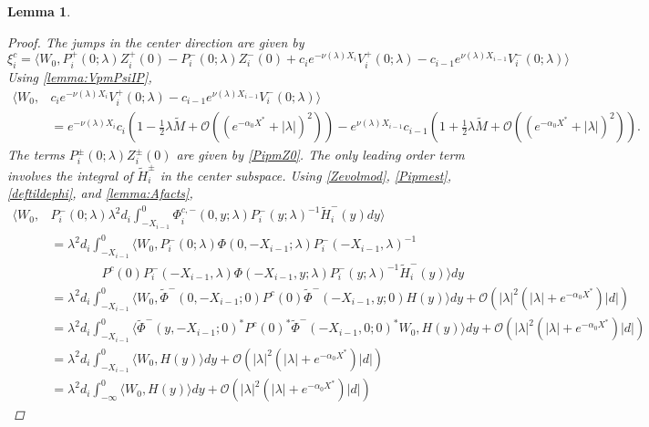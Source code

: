 \documentclass[10pt,reqno]{amsart}
\theoremstyle{plain}
\newtheorem{lemma}[theorem]{Lemma}
\theoremstyle{definition}
\theoremstyle{remark}
\numberwithin{theorem}{section}
\numberwithin{equation}{section}
\begin{document}
\begin{lemma}
\begin{proof}
The jumps in the center direction are given by
\[
\xi_i^c = 
\langle W_0, P_i^+(0; \lambda) Z_i^+(0) - P_i^-(0; \lambda) Z_i^-(0) + c_i e^{-\nu(\lambda)X_i}V_i^+(0; \lambda) - c_{i-1} e^{\nu(\lambda)X_{i-1}} V_i^-(0; \lambda) \rangle 
\]
Using \cref{lemma:VpmPsiIP},
\begin{align*}
\langle W_0, &c_i e^{-\nu(\lambda)X_i}V_i^+(0; \lambda) - c_{i-1} e^{\nu(\lambda)X_{i-1}} V_i^-(0; \lambda) \rangle \\
&= e^{-\nu(\lambda)X_i}c_i\left( 1 - \frac{1}{2}\lambda \tilde{M} + \mathcal{O}\left( (e^{-\alpha_0 X^*} +|\lambda|)^2 \right) \right) 
- e^{\nu(\lambda)X_{i-1}}c_{i-1}\left( 1 + \frac{1}{2}\lambda \tilde{M} + \mathcal{O}\left( (e^{-\alpha_0 X^*} +|\lambda|)^2 \right) \right).
\end{align*}
The terms $P_i^\pm(0; \lambda) Z_i^\pm(0)$ are given by \cref{PipmZ0}. The only leading order term involves the integral of $\tilde{H}_i^\pm$ in the center subspace. Using \cref{Zevolmod}, \cref{Pipmest}, \cref{deftildephi}, and \cref{lemma:Afacts},
\begin{equation*}
\begin{aligned}
\langle W_0, &P_i^-(0; \lambda) \lambda^2 d_i \int_{-X_{i-1}}^0 \Phi_i^{c,-}(0, y; \lambda) P_i^-(y; \lambda)^{-1} \tilde{H}_i^-(y) dy \rangle \\
&= \lambda^2 d_i \int_{-X_{i-1}}^0 \langle W_0, P_i^-(0; \lambda) \Phi(0, -X_{i-1}; \lambda) P_i^-(-X_{i-1}, \lambda)^{-1} \\
&\qquad \qquad
P^c(0) P_i^-(-X_{i-1}, \lambda) \Phi(-X_{i-1}, y; \lambda) P_i^-(y; \lambda)^{-1} \tilde{H}_i^-(y) \rangle dy \\
&= \lambda^2 d_i \int_{-X_{i-1}}^0 \langle W_0, \tilde{\Phi}^-(0, -X_{i-1}; 0) 
P^c(0) \tilde{\Phi}^-(-X_{i-1}, y; 0) H(y) \rangle dy + \mathcal{O}(|\lambda|^2 (|\lambda| + e^{- \alpha_0 X^*}) |d|) \\
&= \lambda^2 d_i \int_{-X_{i-1}}^0 \langle \tilde{\Phi}^-(y, -X_{i-1}; 0)^* P^c(0)^* \tilde{\Phi}^-(-X_{i-1}, 0; 0)^* W_0,
 H(y) \rangle dy + \mathcal{O}(|\lambda|^2 (|\lambda| + e^{- \alpha_0 X^*}) |d|) \\
&= \lambda^2 d_i \int_{-X_{i-1}}^0 \langle W_0, H(y) \rangle dy + \mathcal{O}(|\lambda|^2 (|\lambda| + e^{- \alpha_0 X^*}) |d|) \\
&= \lambda^2 d_i \int_{-\infty}^0 \langle W_0, H(y) \rangle dy + \mathcal{O}(|\lambda|^2 (|\lambda| + e^{- \alpha_0 X^*}) |d|)
\end{aligned}
\end{equation*}

\end{proof}
\end{lemma}
\end{document}
